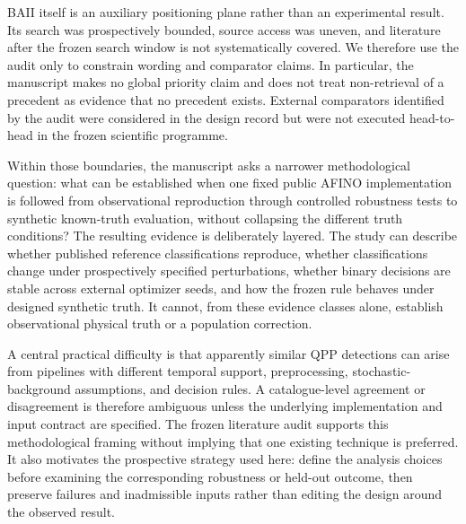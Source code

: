 \documentclass[manuscript,linenumbers]{aastex702}
\begin{document}
BAII itself is an auxiliary positioning plane rather than an experimental result. Its search was prospectively bounded, source access was uneven, and literature after the frozen search window is not systematically covered. We therefore use the audit only to constrain wording and comparator claims. In particular, the manuscript makes no global priority claim and does not treat non-retrieval of a precedent as evidence that no precedent exists. External comparators identified by the audit were considered in the design record but were not executed head-to-head in the frozen scientific programme.

Within those boundaries, the manuscript asks a narrower methodological question: what can be established when one fixed public AFINO implementation is followed from observational reproduction through controlled robustness tests to synthetic known-truth evaluation, without collapsing the different truth conditions? The resulting evidence is deliberately layered. The study can describe whether published reference classifications reproduce, whether classifications change under prospectively specified perturbations, whether binary decisions are stable across external optimizer seeds, and how the frozen rule behaves under designed synthetic truth. It cannot, from these evidence classes alone, establish observational physical truth or a population correction.

A central practical difficulty is that apparently similar QPP detections can arise from pipelines with different temporal support, preprocessing, stochastic-background assumptions, and decision rules. A catalogue-level agreement or disagreement is therefore ambiguous unless the underlying implementation and input contract are specified. The frozen literature audit supports this methodological framing without implying that one existing technique is preferred. It also motivates the prospective strategy used here: define the analysis choices before examining the corresponding robustness or held-out outcome, then preserve failures and inadmissible inputs rather than editing the design around the observed result.
\end{document}
